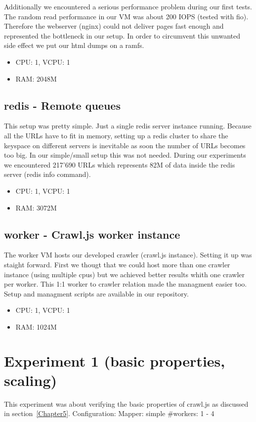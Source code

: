 Additionally we encountered a serious performance problem during our first tests. The random read performance in our VM was about 200 IOPS (tested with fio). Therefore the webserver (nginx) could not deliver pages fast enough and represented the bottleneck in our setup. In order to circumvent this unwanted side effect we put our html dumps on a ramfs.

\begin{itemize}
  \item CPU: 1, VCPU: 1
  \item RAM: 2048M
\end{itemize}

\subsection{redis - Remote queues}
This setup was pretty simple. Just a single redis server instance running. Because all the URLs have to fit in memory, setting up a redis cluster to share the keyspace on different servers is inevitable as soon the number of URLs becomes too big. In our simple/small setup this was not needed. During our experiments we encountered 217'690 URLs which represents 82M of data inside the redis server (redis info command).

\begin{itemize}
  \item CPU: 1, VCPU: 1
  \item RAM: 3072M
\end{itemize}

\subsection{worker - Crawl.js worker instance}
The worker VM hosts our developed crawler (crawl.js instance). Setting it up was staight forward. First we thougt that we could host more than one crawler instance (using multiple cpus) but we achieved better results whith one crawler per worker. This 1:1 worker to crawler relation made the managment easier too. Setup and managment scripts are available in our repository.

\begin{itemize}
  \item CPU: 1, VCPU: 1
  \item RAM: 1024M
\end{itemize}

\section{Experiment 1 (basic properties, scaling)}
This experiment was about verifying the basic properties of crawl.js as discussed in section~\ref{Chapter5}.
Configuration:
Mapper: simple
#workers: 1 - 4

